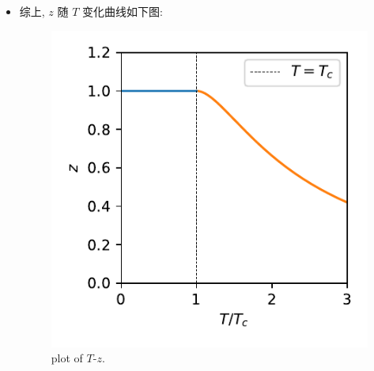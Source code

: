 \begin{itemize}
	\item 综上, $z$ 随 $T$ 变化曲线如下图:
	
	\begin{figure}[H]
		\centering
		\includegraphics[scale=0.8]{figures/plot of T-z.pdf}
		\caption{plot of $T$-$z$.}
	\end{figure}
\end{itemize}

